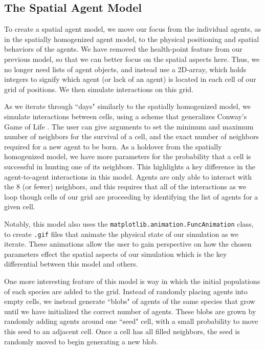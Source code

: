 \documentclass[journal]{IEEEtran}
\begin{document}
\subsection{The Spatial Agent Model}
To create a spatial agent model, we move our focus from the individual agents, as in the spatially homogenized agent model, to the physical positioning and spatial behaviors of the agents. We have removed the health-point feature from our previous model, so that we can better focus on the spatial aspects here. Thus, we no longer need lists of agent objects, and instead use a 2D-array, which holds integers to signify which agent (or lack of an agent) is located in each cell of our grid of positions. We then simulate interactions on this grid.\par
As we iterate through ``days" similarly to the spatially homogenized model, we simulate interactions between cells, using a scheme that generalizes Conway's Game of Life \cite{game_of_life}. The user can give arguments to set the minimum and maximum number of neighbors for the survival of a cell, and the exact number of neighbors required for a new agent to be born. As a holdover from the spatially homogenized model, we have more parameters for the probability that a cell is successful in hunting one of its neighbors. This highlights a key difference in the agent-to-agent interactions in this model. Agents are only able to interact with the 8 (or fewer) neighbors, and this requires that all of the interactions as we loop though cells of our grid are proceeding by identifying the list of agents for a given cell.\par
Notably, this model also uses the \verb|matplotlib.animation.FuncAnimation| class, to create \verb|.gif| files that animate the physical state of our simulation as we iterate. These animations allow the user to gain perspective on how the chosen parameters effect the spatial aspects of our simulation which is the key differential between this model and others.\par
One more interesting feature of this model is way in which the initial populations of each species are added to the grid. Instead of randomly placing agents into empty cells, we instead generate ``blobs" of agents of the same species that grow until we have initialized the correct number of agents. These blobs are grown by randomly adding agents around one ``seed" cell, with a small probability to move this seed to an adjacent cell. Once a cell has all filled neighbors, the seed is randomly moved to begin generating a new blob.
\end{document}
